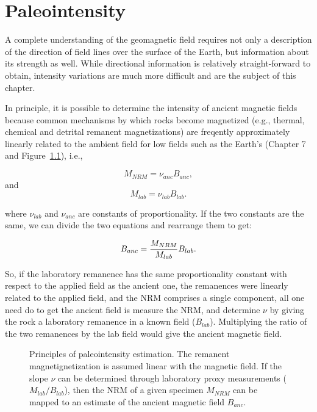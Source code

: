 \chapter{Paleointensity}





 A complete understanding of the geomagnetic field requires not only a description of the direction of field lines over the surface of the Earth, but information about its strength as well.  While directional information is relatively straight-forward to obtain, intensity variations are much more difficult and are the subject of  this chapter.


 In principle, it is possible to determine the
intensity of ancient magnetic fields because  common mechanisms
by which rocks become magnetized (e.g., thermal, chemical and detrital remanent
magnetizations) 
are freqently  approximately linearly related to the 
ambient field for
low fields such as the Earth's (Chapter 7 and Figure~\ref{fig:pintprinc}), i.e.,
 
 $$
 M_{NRM}   = \nu_{anc} B_{anc},
 $$
 \noindent and
 $$
 M_{lab}  =  \nu_{lab} B_{lab}.
 $$
 
\noindent  where $\nu_{lab}$ and $\nu_{anc}$ are constants of proportionality. If the two constants  are the same, we can divide the two  equations and rearrange them to get:

\begin{equation}
{B_{anc} }=  {M_{NRM} \over {M_{lab}}}{B_{lab} }.
\label{eq:banc}
\end{equation}
 
 \noindent  So,  if the laboratory remanence has the same proportionality constant with respect to the applied field  as the ancient one,  the remanences  were linearly related to the applied field, and the NRM comprises a single component, all one need do  to get the ancient field is  measure the NRM,
and determine $\nu$ by giving the rock a laboratory remanence in a known field ($B_{lab}$).  Multiplying the ratio of the two remanences by the  lab field would give the ancient magnetic field.  
 
 \begin{figure}[htb]
\epsfxsize 8cm
\centering {}
\caption{Principles of  paleointensity estimation.  The remanent magnetignetization is assumed linear with the magnetic field. If the slope $\nu$ can be determined through laboratory proxy measurements ($M_{lab}/B_{lab}$), then the  NRM of a given specimen $M_{NRM}$ can be mapped to an estimate of the ancient magnetic field $B_{anc}$.}
\label{fig:pintprinc}
\end{figure}


